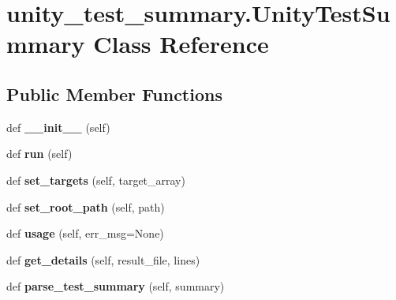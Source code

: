 \hypertarget{classunity__test__summary_1_1UnityTestSummary}{}\section{unity\+\_\+test\+\_\+summary.\+Unity\+Test\+Summary Class Reference}
\label{classunity__test__summary_1_1UnityTestSummary}
\subsection*{Public Member Functions}
\begin{DoxyCompactItemize}
\item 
\mbox{\label{classunity__test__summary_1_1UnityTestSummary_a7d10482c28be1ca8844eafb7bb2d0516}} 
def {\bfseries \+\_\+\+\_\+init\+\_\+\+\_\+} (self)
\item 
\mbox{\label{classunity__test__summary_1_1UnityTestSummary_a191111866f7267d605db2f8793ef9a1a}} 
def {\bfseries run} (self)
\item 
\mbox{\label{classunity__test__summary_1_1UnityTestSummary_a5a8af2531586e22b4315e5d09d283cb7}} 
def {\bfseries set\+\_\+targets} (self, target\+\_\+array)
\item 
\mbox{\label{classunity__test__summary_1_1UnityTestSummary_ae03b008285e29a16d2069120878a2c96}} 
def {\bfseries set\+\_\+root\+\_\+path} (self, path)
\item 
\mbox{\label{classunity__test__summary_1_1UnityTestSummary_a066f34e5b57d43f0d2397b0e84f5d92b}} 
def {\bfseries usage} (self, err\+\_\+msg=None)
\item 
\mbox{\label{classunity__test__summary_1_1UnityTestSummary_a9baaa8a7f8b862b125f8991c359b2252}} 
def {\bfseries get\+\_\+details} (self, result\+\_\+file, lines)
\item 
\mbox{\label{classunity__test__summary_1_1UnityTestSummary_ae79303d5a81b382b06c557d6c5bf72e8}} 
def {\bfseries parse\+\_\+test\+\_\+summary} (self, summary)
\end{DoxyCompactItemize}
